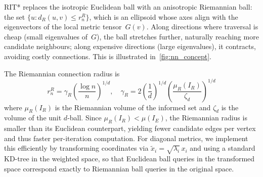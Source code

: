 \documentclass[journal]{IEEEtran}
\newcommand{\IR}{I_{\!R}}
\newcommand{\IE}{I_{\!E}}
\newcommand{\dR}{d_{\!R}}
\newcommand{\muR}{\mu_{\!R}}
\begin{document}
RIT* replaces the isotropic Euclidean ball with an anisotropic
Riemannian ball: the set $\{ u : \dR(u, v) \le r_n^R \}$, which
is an ellipsoid whose axes align with the eigenvectors of the local
metric tensor~$G(v)$.
Along directions where traversal is cheap (small eigenvalues of~$G$),
the ball stretches further, naturally reaching more candidate
neighbours; along expensive directions (large eigenvalues), it
contracts, avoiding costly connections.
This is illustrated in~\cref{fig:nn_concept}.

The Riemannian connection radius is
\begin{equation}\label{eq:radius}
  r_n^R = \gamma_R \!\left(\frac{\log n}{n}\right)^{\!1/d}\!,\quad
  \gamma_R = 2\!\left(\frac{1}{d}\right)^{\!1/d}
             \!\left(\frac{\muR(\IR)}{\zeta_d}\right)^{\!1/d}
\end{equation}
where $\muR(\IR)$ is the Riemannian volume of the informed set and
$\zeta_d$ is the volume of the unit $d$-ball.
Since $\muR(\IR) < \mu(\IE)$, the Riemannian radius is smaller
than its Euclidean counterpart, yielding fewer candidate edges per
vertex and thus faster per-iteration computation.
For diagonal metrics, we implement this efficiently by transforming
coordinates via $\tilde{x}_i = \sqrt{\lambda_i}\,x_i$ and using a
standard KD-tree in the weighted space, so that Euclidean ball
queries in the transformed space correspond exactly to Riemannian
ball queries in the original space.
\end{document}
